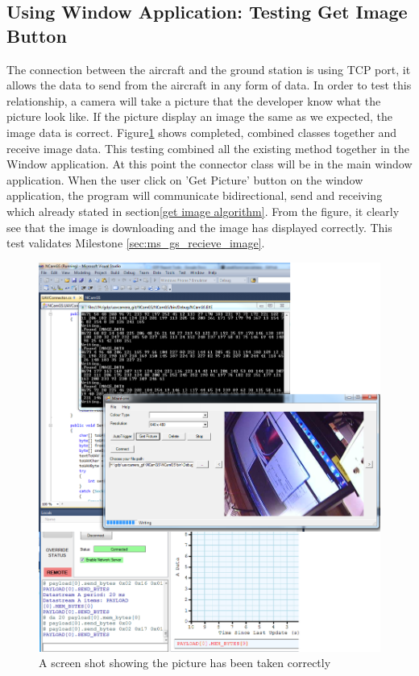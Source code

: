 \subsection{Using Window Application: Testing Get Image Button}
The connection between the aircraft and the ground station is using TCP port, it allows the data to send from the aircraft in any form of data. 
In order to test this relationship, a camera will take a picture that the developer know what the picture look like. 
If the picture display an image the same as we expected, the image data is correct.
Figure\ref{camera testing1} shows completed, combined classes together and receive image data.
This testing combined all the existing method together in the Window application.
At this point the connector class will be in the main window application.
When the user click on 'Get Picture' button on the window application, the program will communicate bidirectional, send and receiving which already stated in section\ref{get image algorithm}. 
From the figure, it clearly see that the image is downloading and the image has displayed correctly. This test validates Milestone \ref{sec:ms_gs_recieve_image}. 
\begin{figure}[H]
\begin{center}
\includegraphics[width=1.00\textwidth]{testing_screenshots/cam_test_11.png} 
\end{center}
\caption{A screen shot showing the picture has been taken correctly\label {camera testing1}}
\end{figure}
